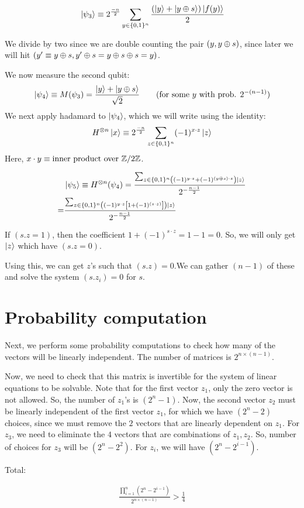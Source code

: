 \begin{align*}
    &\ket{\psi_3}  \equiv 2^\frac{-n}{2} \sum_{y \in \{0, 1\}^n} \frac{\left( \ket y + \ket{y \oplus s} \right) \ket{f(y)}}{2} \\
\end{align*}

We divide by two since we are double counting the pair $(y, y \oplus s)$, since later
we will hit $(y' \equiv y \oplus s, y' \oplus s = y \oplus s \oplus s = y)$.

We now measure the second qubit:
\begin{align*}
    &\ket{\psi_4} \equiv M(\psi_3) =  \frac{\ket y + \ket{y \oplus s}}{\sqrt 2} \qquad \text{(for some $y$ with prob. $2^{-(n - 1)}$)} \\
\end{align*}
We next apply hadamard to $\ket{\psi_4}$, which we will write using the
identity:
$$H^{\otimes n}\ket x \equiv 2^{\frac{-n}{2}} \sum_{z \in \{0, 1\}^n} (-1)^{x \cdot z} \ket z$$
Here, $x \cdot y \equiv \text{inner product over $\mathbb{Z}/2\mathbb{Z}$}$.

\begin{align*}
    &\ket{\psi_5} \equiv H^{\otimes n} (\psi_4) = 
    \frac{\sum_{z \in \{0, 1\}^n \left( (-1)^{y \cdot z} + (-1)^{(y \oplus s) \cdot z} \right) \ket z }}
        {2^{- \frac{n-1}{2}}} \\
    = 
    &\frac{\sum_{z \in \{0, 1\}^n \left( (-1)^{y \cdot z} \left[ 1 + (-1)^{(s \cdot z)}\right] \right) \ket z }}
        {2^{- \frac{n-1}{2}}} \\
\end{align*}

If $(s . z = 1)$, then the coefficient $1 + (-1)^{s \cdot z} = 1 - 1 = 0$. So,
we will only get $\ket z$ which have $(s . z = 0)$.

Using this, we can get $z$'s such that $(s . z) = 0$.We can gather $(n - 1)$
of these and solve the system $(s . z_i) = 0$ for $s$.

\section{Probability computation}
Next, we perform some probability computations to check how many of the vectors
will be linearly independent.  The number of matrices is $2^{n \times (n - 1)}$.

Now, we need to check that this matrix is invertible for the system of linear
equations to be solvable. Note that for the first vector $z_1$, only the zero
vector is not allowed. So, the number of $z_1$'s is $(2^n - 1)$. Now,
the second vector $z_2$ must be linearly independent of the first vector $z_1$,
for which we have $(2^n - 2)$ choices, since we must remove the $2$ vectors
that are linearly dependent on $z_1$. For $z_3$, we need to eliminate the $4$ 
vectors that are combinations of $z_1, z_2$. So, number of choices for $z_3$
will be $(2^n - 2^2)$. For $z_i$, we will have $(2^n - 2^{i - 1})$.

Total: 

\begin{align*}
    \frac{\prod_{i=1}^n(2^n - 2^{i - 1})}{2^{n \times (n - 1)}} > \frac{1}{4}
\end{align*}

